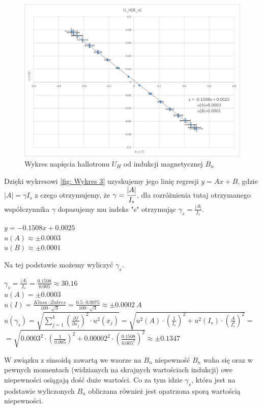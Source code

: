 \documentclass{article}
\begin{document}
\begin{figure}[h]
    \centering
    \includegraphics{U_H_od_B_n.png}
    \caption{Wykres napięcia hallotronu $U_{H}$ od indukcji magnetycznej $B_{n}$ }
    \label{fig:rys3}
\end{figure}{}
Dzięki wykresowi \ref{fig: Wykres 3} uzyskujemy jego linię regresji $y=Ax+B$, gdzie $|A|=\gamma I_{s}$ z czego otrzymujemy, że $\gamma=\cfrac{|A|}{I_{s}}$, dla rozróżnienia tutaj otrzymanego współczynnika $\gamma$ dopasujemy mu indeks "s" otrzymując $\gamma_{s}=\frac{|A|}{I_{s}}$.
\begin{center}
    $y=-0.1508x+0.0025$\\
    $u(A)\approx\pm0.0003$\\
    $u(B)\approx\pm0.0001$
\end{center}{}
\newpage
Na tej podstawie możemy wyliczyć $\gamma_{s}$.
\begin{center}
    \vspace{2.5ex}
    $\gamma_{s}=\frac{|A|}{I_{s}}=\frac{0.1508}{0.005}\approx30.16$\\
    \vspace{2.5ex}
    $u(A)=\pm0.0003$\\
    \vspace{2.5ex}
    $u(I)=\frac{Klasa\cdot Zakres}{100\cdot \sqrt{3}}=\frac{0.5\cdot0.0075}{100\cdot \sqrt{3}}\approx\pm0.0002 \ A$\\
    \vspace{2.5ex}
    $u(\gamma_{s})=\sqrt{\sum^{k}_{j=1}\left(\frac{\partial f}{\partial x_{j}}\right)^{2}\cdot u^{2}(x_{j})}=\sqrt{u^{2}(A)\cdot\left(\frac{1}{I_{s}}\right)^{2}+u^{2}(I_{s})\cdot(\frac{A}{I_{s}^{2}})^{2}}=$\\
    \vspace{2.5ex}
    $=\sqrt{0.0003^{2}\cdot\left(\frac{1}{0.005}\right)^{2}+0.00002^{2}\cdot(\frac{0.1508}{0.005^{2}})^{2}}  \approx\pm0.1347$\\
    \vspace{2.5ex}
\end{center}
W związku z sinsoidą zawartą we wzorze na $B_{n}$ niepewność $B_{n}$ waha się oraz w pewnych momentach (widzianych na skrajnych wartościach indukcji) owe niepewności osiągają dość duże wartości. Co za tym idzie $\gamma_{s}$, która jest na podstawie wyliczonych $B_{n}$ obliczana również jest opatrzona sporą wartością niepewności.\\
\end{document}
